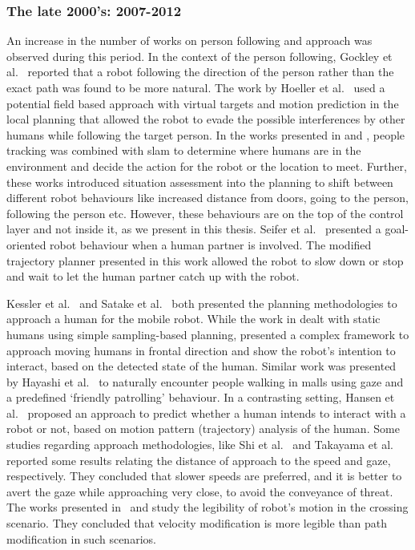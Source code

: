 \subsubsection{The late 2000's: 2007-2012}
An increase in the number of works on person following and approach was observed during this period. In the context of the person following, Gockley et al.~\cite{gockley2007natural} reported that a robot following the direction of the person rather than the exact path was found to be more natural. The work by Hoeller et al.~\cite{hoeller2007accompanying} used a potential field based approach with virtual targets and motion prediction in the local planning that allowed the robot to evade the possible interferences by other humans while following the target person. In the works presented in \cite{zender2007human} and \cite{granata2012framework}, people tracking was combined with \acrshort{slam}  to determine where humans are in the environment and decide the action for the robot or the location to meet. Further, these works introduced situation assessment into the planning to shift between different robot behaviours like increased distance from doors, going to the person, following the person etc. However, these behaviours are on the top of the control layer and not inside it, as we present in this thesis. Seifer et al.~\cite{feil2011people} presented a goal-oriented robot behaviour when a human partner is involved. The modified trajectory planner presented in this work allowed the robot to slow down or stop and wait to let the human partner catch up with the robot. 

Kessler et al.~\cite{kessler2011approaching} and Satake et al.~\cite{satake2009approach} both presented the planning methodologies to approach a human for the mobile robot. While the work in \cite{kessler2011approaching} dealt with static humans using simple sampling-based planning, \cite{satake2009approach} presented a complex framework to approach moving humans in frontal direction and show the robot’s intention to interact, based on the detected state of the human. Similar work was presented by Hayashi et al.~\cite{hayashi2012friendly} to naturally encounter people walking in malls using gaze and a predefined ‘friendly patrolling’ behaviour. In a contrasting setting, Hansen et al.~\cite{hansen2009adaptive} proposed an approach to predict whether a human intends to interact with a robot or not, based on motion pattern (trajectory) analysis of the human. Some studies regarding approach methodologies, like Shi et al.~\cite{shi2008human} and Takayama et al.~\cite{takayama2009influences} reported some results relating the distance of approach to the speed and gaze, respectively. They concluded that slower speeds are preferred, and it is better to avert the gaze while approaching very close, to avoid the conveyance of threat. The works presented in~\cite{lichtenthaler2012influence} and \cite{kruse2012legible} study the legibility of robot’s motion in the crossing scenario. They concluded that velocity modification is more legible than path modification in such scenarios.

